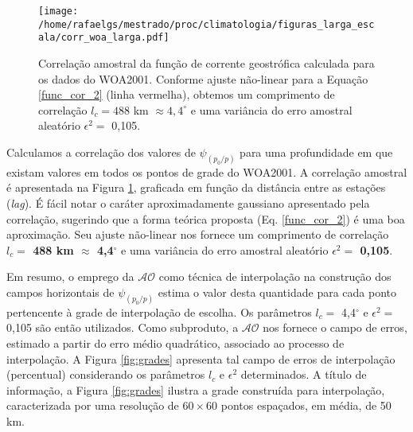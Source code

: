 \begin{figure}%
 \begin{center}
  \texttt{[image: /home/rafaelgs/mestrado/proc/climatologia/figuras\_larga\_escala/corr\_woa\_larga.pdf]}
 \end{center}
 \vspace{-.25cm}
 \renewcommand{\baselinestretch}{1}
 \caption{\label{fig:func_corr} \small Correlação amostral da função de corrente 
 geostrófica calculada para os dados do WOA2001. Conforme ajuste não-linear para a Equação 
 \ref{func_cor_2} (linha vermelha), obtemos um comprimento de correlação $l_c = 488$ km 
 $\approx 4,4^\circ$ e uma variância do erro amostral aleatório $\epsilon^2 =$ 0,105.}
\end{figure}

Calculamos a correlação dos valores de $\psi_{(p_0/p)}$ para uma profundidade em que existam valores em 
todos os pontos de grade do WOA2001. A correlação amostral é apresentada na Figura \ref{fig:func_corr}, 
graficada em função da distância entre as estações (\textit{lag}). É fácil notar o caráter 
aproximadamente gaussiano apresentado pela correlação, sugerindo que a forma teórica proposta 
(Eq. \ref{func_cor_2}) é uma boa aproximação. Seu ajuste não-linear nos fornece um comprimento de 
correlação \textbf{$l_c =$ 488 km $\approx$ 4,4$^\circ$} e uma variância do erro amostral 
aleatório \textbf{$\epsilon^2 =$ 0,105}. 


Em resumo, o emprego da $\mathcal{AO}$ como técnica de interpolação na construção dos campos 
horizontais de $\psi_{(p_0/p)}$ estima o valor desta quantidade para cada ponto pertencente à grade de 
interpolação de escolha. Os parâmetros $l_c =$ 4,4$^\circ$ e $\epsilon^2 =$ 0,105 são então 
utilizados. Como subproduto, a $\mathcal{AO}$ nos fornece o campo de erros, estimado a partir do erro 
médio quadrático, associado ao processo de interpolação. A Figura \ref{fig:grades} 
apresenta tal campo de erros de interpolação (percentual) considerando os parâmetros $l_c$ e 
$\epsilon^2$ determinados. 
A título de informação, a Figura \ref{fig:grades} ilustra a grade construída para 
interpolação, caracterizada por uma resolução de $60 \times 60$ pontos espaçados, em média, 
de 50 km.


